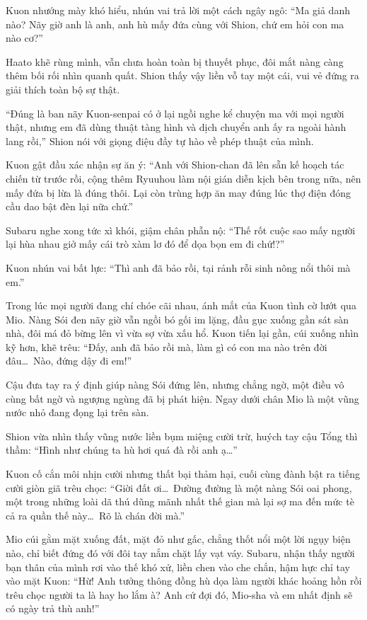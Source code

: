 \documentclass[../main.tex]{subfiles}
\begin{document}
Kuon nhướng mày khó hiểu, nhún vai trả lời một cách ngây ngô: ``Ma giả danh nào? Nãy giờ anh là anh, anh hù mấy đứa cùng với Shion, chứ em hỏi con ma nào cơ?''

Haato khẽ rùng mình, vẫn chưa hoàn toàn bị thuyết phục, đôi mắt nàng càng thêm bối rối nhìn quanh quất. Shion thấy vậy liền vỗ tay một cái, vui vẻ đứng ra giải thích toàn bộ sự thật.

``Đúng là ban nãy Kuon-senpai có ở lại ngồi nghe kể chuyện ma với mọi người thật, nhưng em đã dùng thuật tàng hình và dịch chuyển anh ấy ra ngoài hành lang rồi,'' Shion nói với giọng điệu đầy tự hào về phép thuật của mình.

Kuon gật đầu xác nhận sự ăn ý: ``Anh với Shion-chan đã lên sẵn kế hoạch tác chiến từ trước rồi, cộng thêm Ryuuhou làm nội gián diễn kịch bên trong nữa, nên mấy đứa bị lừa là đúng thôi. Lại còn trùng hợp ăn may đúng lúc thợ điện đóng cầu dao bật đèn lại nữa chứ.''

Subaru nghe xong tức xì khói, giậm chân phẫn nộ: ``Thế rốt cuộc sao mấy người lại hùa nhau giở mấy cái trò xàm lơ đó để dọa bọn em đi chứ!?''

Kuon nhún vai bất lực: ``Thì anh đã bảo rồi, tại rảnh rỗi sinh nông nổi thôi mà em.''

Trong lúc mọi người đang chí chóe cãi nhau, ánh mắt của Kuon tình cờ lướt qua Mio. Nàng Sói đen nãy giờ vẫn ngồi bó gối im lặng, đầu gục xuống gần sát sàn nhà, đôi má đỏ bừng lên vì vừa sợ vừa xấu hổ. Kuon tiến lại gần, cúi xuống nhìn kỹ hơn, khẽ trêu: ``Đấy, anh đã bảo rồi mà, làm gì có con ma nào trên đời đâu\dots\ Nào, đứng dậy đi em!''

Cậu đưa tay ra ý định giúp nàng Sói đứng lên, nhưng chẳng ngờ, một điều vô cùng bất ngờ và ngượng ngùng đã bị phát hiện. Ngay dưới chân Mio là một vũng nước nhỏ đang đọng lại trên sàn.

Shion vừa nhìn thấy vũng nước liền bụm miệng cười trừ, huých tay cậu Tổng thì thầm: ``Hình như chúng ta hù hơi quá đà rồi anh ạ\dots''

Kuon cố cắn môi nhịn cười nhưng thất bại thảm hại, cuối cùng đành bật ra tiếng cười giòn giã trêu chọc: ``Giời đất ơi\dots\ Đường đường là một nàng Sói oai phong, một trong những loài dã thú dũng mãnh nhất thế gian mà lại sợ ma đến mức tè cả ra quần thế này\dots\ Rõ là chán đời mà.''

Mio cúi gằm mặt xuống đất, mặt đỏ như gấc, chẳng thốt nổi một lời ngụy biện nào, chỉ biết đứng đó với đôi tay nắm chặt lấy vạt váy. Subaru, nhận thấy người bạn thân của mình rơi vào thế khó xử, liền chen vào che chắn, hậm hực chỉ tay vào mặt Kuon: ``Hừ! Anh tưởng thông đồng hù dọa làm người khác hoảng hồn rồi trêu chọc người ta là hay ho lắm à? Anh cứ đợi đó, Mio-sha và em nhất định sẽ có ngày trả thù anh!''
\end{document}
